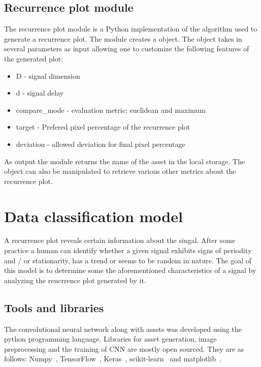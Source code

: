 \documentclass[a4paper,12pt,fleqn]{article}
\begin{document}
\subsection{Recurrence plot module}
\label{sec:recurrence_plot_module}
The recurrence plot module is a Python implementation of the algorithm used to generate a recurrence plot.
The module creates a  object.
The object takes in several parameters as input allowing one to customize the following features of the generated plot:
\begin{itemize}
  \item D - signal dimension
  \item d - signal delay
  \item compare\_mode - evaluation metric: euclidean and maximum 
  \item target - Prefered pixel percentage of the recurrence plot
  \item deviation - allowed deviation for final pixel percentage
\end{itemize}
As output the module returns the name of the asset in the local storage.
The object can also be manipulated to retrieve various other metrics about the recurrence plot.


\section{Data classification model}
A recurrence plot reveals certain information about the singal.
After some practice a human can identify whether a given signal exhibits signs of periodity and / or stationarity, has a trend or seems to be random in nature.
The goal of this model is to determine some the aforementioned characteristics of a signal by analyzing the reucrrence plot generated by it.


\subsection{Tools and libraries}
The convolutional neural network along with assets was developed using the python programming language. Libraries for asset generation, image preprocessing and the training of CNN are mostly open sourced. They are as follows: Numpy~\cite{numpy}, TensorFlow~\cite{tensorflow}, Keras~\cite{keras}, scikit-learn~\cite{scikit-learn} and matplotlib~\cite{matplotlib}.
\end{document}
